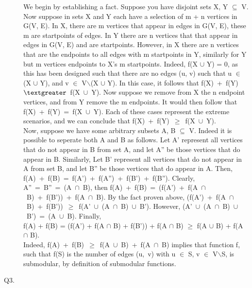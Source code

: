 \documentclass[10pt]{csc_assignment}
\begin{document}
\begin{description}
We begin by establishing a fact. Suppose you have disjoint sets X, Y $\subseteq$ V.
Now suppose in sets X and Y each have a selection of m + n vertices in 
G(V, E). In X, there are m vertices that appear in edges in G(V, E), these m are 
startpoints of edges. In Y there are n vertices that that appear in edges in G(V, E) and are startpoints. However, in X there are n vertices that are the endpoints to all edges with m startpoints in Y, similarly for Y but m vertices endpoints to X's m startpoints. Indeed, f(X $\cup$ Y) = 0, as this has been designed such that there are no edges (u, v) such that u $\in$ (X $\cup$ Y), and v $\in$ V$\backslash$(X $\cup$ Y). In this case, it follows that \mbox{f(X) + f(Y) $\textgreater$ f(X $\cup$ Y)}. Now suppose we remove from X the n endpoint vertices, and
from Y remove the m endpoints. It would then follow that \mbox{f(X) + f(Y) = f(X $\cup$ Y)}. Each of these cases represent the extreme scenarios, and we can conclude that 
\mbox{f(X) + f(Y) $\geqslant$ f(X $\cup$ Y)}.\\

Now, suppose we have some arbitrary subsets A, B $\subseteq$ V. Indeed it is possible to seperate both A and B as follows. Let A' represent all vertices that do not appear in B from set A, and let A'' be those vertices that do appear in B. Similarly, Let B' represent all vertices that do not appear in A from set B, and let B'' be those vertices that do appear in A. Then, \mbox{f(A) + f(B) = f(A') + f(A'') + f(B') + f(B'')}. Clearly, \mbox{A'' = B'' = (A $\cap$ B)}, then \mbox{f(A) + f(B) = (f(A') + f(A $\cap$ B) + f(B')) + f(A $\cap$ B)}. By the fact proven above, \mbox{(f(A') + f(A $\cap$ B) + f(B')) $\geqslant$ f(A' $\cup$ (A $\cap$ B) $\cup$ B').} However, \mbox{(A' $\cup$ (A $\cap$ B) $\cup$ B') = (A $\cup$ B)}. Finally, \\f(A) + f(B) = (f(A') + f(A $\cap$ B) + f(B')) + f(A $\cap$ B) $\geqslant$ f(A $\cup$ B) + f(A $\cap$ B). \\

Indeed, \mbox{f(A) + f(B) $\geqslant$ f(A $\cup$ B) + f(A $\cap$ B)} implies that function f,
such that f(S) is the number of edges \mbox{(u, v)} with u $\in$ S, v $\in$ V$\backslash$S, is 
submodular, by definition of submodular functions.
 


\newpage
\item[Q3.]


\end{description}
\end{document}
